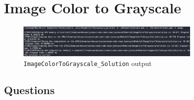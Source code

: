 \documentclass[../main.tex]{subfiles}
\begin{document}
\pagestyle{fancy}


\renewcommand{\thefigure}{\arabic{figure}}
\section*{Image Color to Grayscale}

\begin{figure}
    [ht]
    \centering
    \includegraphics[width=0.8\textwidth]{imagecolortograyscale.png}
    \caption{\texttt{ImageColorToGrayscale\_Solution} output}
\end{figure}

\subsection*{Questions}
\end{document}
